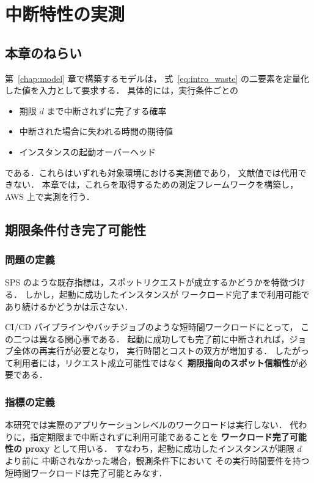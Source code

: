 \documentclass[11pt,a4paper]{ltjsreport}
\begin{document}
\chapter{中断特性の実測}
\label{chap:measure}

\section{本章のねらい}

第~\ref{chap:model} 章で構築するモデルは，
式~\eqref{eq:intro_waste} の二要素を定量化した値を入力として要求する．
具体的には，実行条件ごとの

\begin{itemize}
  \item 期限 $d$ まで中断されずに完了する確率
  \item 中断された場合に失われる時間の期待値
  \item インスタンスの起動オーバーヘッド
\end{itemize}

である．これらはいずれも対象環境における実測値であり，
文献値では代用できない．
本章では，これらを取得するための測定フレームワークを構築し，
AWS 上で実測を行う．

\section{期限条件付き完了可能性}

\subsection{問題の定義}

SPS のような既存指標は，スポットリクエストが成立するかどうかを特徴づける．
しかし，起動に成功したインスタンスが
ワークロード完了まで利用可能であり続けるかどうかは示さない．

CI/CD パイプラインやバッチジョブのような短時間ワークロードにとって，
この二つは異なる関心事である．
起動に成功しても完了前に中断されれば，ジョブ全体の再実行が必要となり，
実行時間とコストの双方が増加する．
したがって利用者には，リクエスト成立可能性ではなく
\textbf{期限指向のスポット信頼性}が必要である．

\subsection{指標の定義}

本研究では実際のアプリケーションレベルのワークロードは実行しない．
代わりに，指定期限まで中断されずに利用可能であることを
\textbf{ワークロード完了可能性の proxy} として用いる．
すなわち，起動に成功したインスタンスが期限 $d$ より前に
中断されなかった場合，観測条件下において
その実行時間要件を持つ短時間ワークロードは完了可能とみなす．
\end{document}
